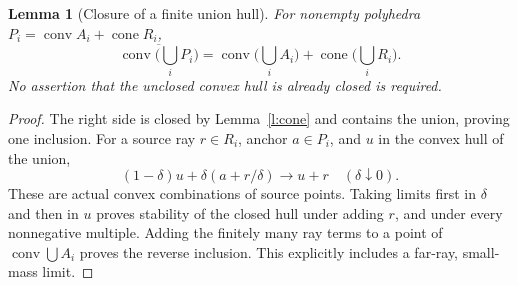 \documentclass[11pt]{article}
\newtheorem{lemma}[theorem]{Lemma}
\theoremstyle{definition}\newtheorem{definition}[theorem]{Definition}
\theoremstyle{remark}\newtheorem{remark}[theorem]{Remark}
\newcommand{\conv}{\operatorname{conv}}\newcommand{\cone}{\operatorname{cone}}
\begin{document}
\begin{lemma}[Closure of a finite union hull]\label{l:closure}
For nonempty polyhedra $P_i=\conv A_i+\cone R_i$,
\[
 \overline{\conv\bigl(\bigcup_iP_i\bigr)}
 =\conv\bigl(\bigcup_iA_i\bigr)+\cone\bigl(\bigcup_iR_i\bigr).
\]
No assertion that the unclosed convex hull is already closed is required.
\end{lemma}
\begin{proof}
The right side is closed by Lemma~\ref{l:cone} and contains the union, proving one inclusion. For a source ray $r\in R_i$, anchor $a\in P_i$, and $u$ in the convex hull of the union,
\[
 (1-\delta)u+\delta(a+r/\delta)\longrightarrow u+r
 \quad(\delta\downarrow0).
\]
These are actual convex combinations of source points. Taking limits first in $\delta$ and then in $u$ proves stability of the closed hull under adding $r$, and under every nonnegative multiple. Adding the finitely many ray terms to a point of $\conv\bigcup A_i$ proves the reverse inclusion. This explicitly includes a far-ray, small-mass limit.
\end{proof}
\end{document}
